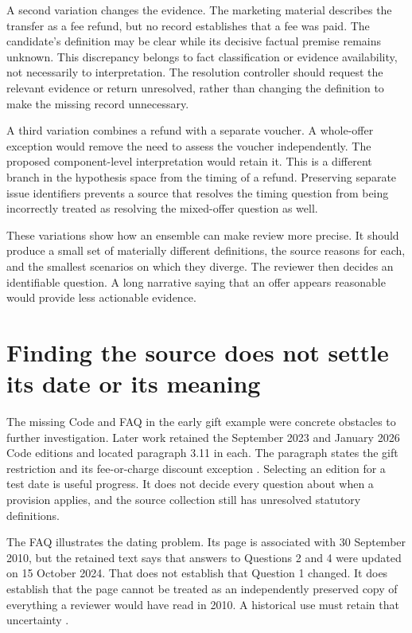 A second variation changes the evidence. The marketing material describes the
transfer as a fee refund, but no record establishes that a fee was paid. The
candidate's definition may be clear while its decisive factual premise remains
unknown. This discrepancy belongs to fact classification or evidence
availability, not necessarily to interpretation. The resolution controller
should request the relevant evidence or return unresolved, rather than
changing the definition to make the missing record unnecessary.

A third variation combines a refund with a separate voucher. A whole-offer
exception would remove the need to assess the voucher independently. The
proposed component-level interpretation would retain it. This is a different
branch in the hypothesis space from the timing of a refund. Preserving separate
issue identifiers prevents a source that resolves the timing question from
being incorrectly treated as resolving the mixed-offer question as well.

These variations show how an ensemble can make review more precise. It should
produce a small set of materially different definitions, the source reasons
for each, and the smallest scenarios on which they diverge. The reviewer then
decides an identifiable question. A long narrative saying that an offer appears
reasonable would provide less actionable evidence.

\section{Finding the source does not settle its date or its meaning}
\label{sec:retrieved-authority}

The missing Code and FAQ in the early gift example were concrete obstacles to
further investigation. Later work retained the September 2023 and January 2026
Code editions and located paragraph 3.11 in each. The paragraph states the gift
restriction and its fee-or-charge discount exception
\citep[para.~3.11]{sfccode2023,sfccode2026}. Selecting an edition for a test date
is useful progress. It does not decide every question about when a provision
applies, and the source collection still has unresolved statutory definitions.

The FAQ illustrates the dating problem. Its page is associated
with 30 September 2010, but the retained text says that answers to Questions 2
and 4 were updated on 15 October 2024. That does not establish that Question 1
changed. It does establish that the page cannot be treated as an independently
preserved copy of everything a reviewer would have read in 2010. A historical
use must retain that uncertainty \citep{sfcgiftfaq}.

